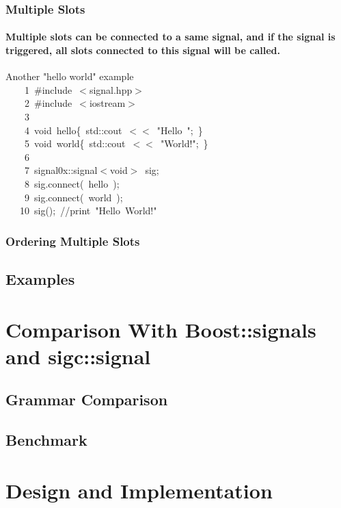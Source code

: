 \documentclass[9pt,onside,a4paper]{article}
\newcommand{\hlstd}[1]{\textcolor[rgb]{0.2,0,0.4}{#1}}
\newcommand{\hlstr}[1]{\textcolor[rgb]{0.09,0.38,0.65}{#1}}
\newcommand{\hlslc}[1]{\textcolor[rgb]{0,0.4,0.2}{#1}}
\newcommand{\hlppc}[1]{\textcolor[rgb]{0.33,0.45,0.69}{#1}}
\newcommand{\hlopt}[1]{\textcolor[rgb]{0.33,0.33,0.33}{#1}}
\newcommand{\hllin}[1]{\textcolor[rgb]{0.6,0.6,0.6}{#1}}
\newcommand{\hlkwb}[1]{\textcolor[rgb]{0.96,0.55,0.14}{#1}}
\newcommand{\hlkwd}[1]{\textcolor[rgb]{0.82,0.11,0.93}{#1}}
\begin{document}
\subsubsection{Multiple Slots}

\paragraph{Multiple slots can be connected to a same signal, and if the signal is triggered, all slots connected to this signal will be called.  \\}
Another "hello world" example \\

\noindent
\ttfamily
\hlstd{}\hllin{\ \ \ \ 1\ }\hlppc{\#include\ $<$signal.hpp$>$}\\
\hllin{\ \ \ \ 2\ }\hlstd{}\hlppc{\#include\ $<$iostream$>$}\\
\hllin{\ \ \ \ 3\ }\hlstd{}\\
\hllin{\ \ \ \ 4\ }\hlkwb{void\ }\hlstd{hello}\hlopt{\{\ }\hlstd{std}\hlopt{::}\hlstd{cout\ }\hlopt{$<$$<$\ }\hlstd{}\hlstr{"Hello\ "}\hlstd{}\hlopt{;\ \}}\\
\hllin{\ \ \ \ 5\ }\hlstd{}\hlkwb{void\ }\hlstd{world}\hlopt{\{\ }\hlstd{std}\hlopt{::}\hlstd{cout\ }\hlopt{$<$$<$\ }\hlstd{}\hlstr{"World!"}\hlstd{}\hlopt{;\ \}}\\
\hllin{\ \ \ \ 6\ }\hlstd{\\
\hllin{\ \ \ \ 7\ }signal0x}\hlopt{::}\hlstd{signal}\hlopt{$<$}\hlstd{}\hlkwb{void}\hlstd{}\hlopt{$>$\ }\hlstd{sig}\hlopt{;}\\
\hllin{\ \ \ \ 8\ }\hlstd{sig}\hlopt{.}\hlstd{}\hlkwd{connect}\hlstd{}\hlopt{(\ }\hlstd{hello\ }\hlopt{);}\\
\hllin{\ \ \ \ 9\ }\hlstd{sig}\hlopt{.}\hlstd{}\hlkwd{connect}\hlstd{}\hlopt{(\ }\hlstd{world\ }\hlopt{);}\\
\hllin{\ \ \ 10\ }\hlstd{}\hlkwd{sig}\hlstd{}\hlopt{();\ }\hlstd{}\hlslc{//print\ "Hello\ World!"}\hlstd{}\\
\mbox{}
\normalfont
\normalsize


\subsubsection{Ordering Multiple Slots}






\subsection{Examples}



\section{Comparison With Boost::signals and sigc::signal}
\subsection{Grammar Comparison}
\subsection{Benchmark}

\section{Design and Implementation}
\end{document}
